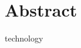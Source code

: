 \newpage\null\thispagestyle{empty}\newpage
\chapter*{Abstract}

\renewcommand{\thepage}{\roman{page}}

technology
